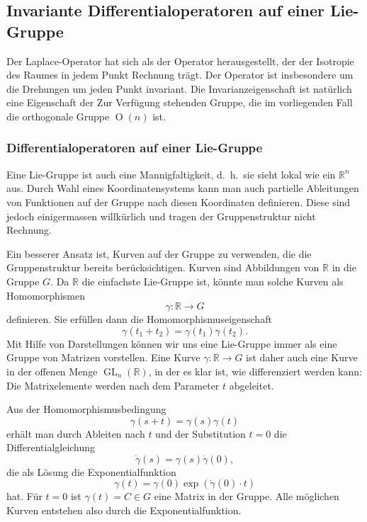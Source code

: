 %
%
\subsection{Invariante Differentialoperatoren auf einer Lie-Gruppe}
Der Laplace-Operator hat sich als der Operator herausgestellt, der
der Isotropie des Raumes in jedem Punkt Rechnung trägt.
Der Operator ist insbesondere um die Drehungen um jeden Punkt
invariant.
Die Invarianzeigenschaft ist natürlich eine Eigenschaft der 
Zur Verfügung stehenden Gruppe, die im vorliegenden Fall die
orthogonale Gruppe $\operatorname{O}(n)$ ist.

%
%
\subsubsection{Differentialoperatoren auf einer Lie-Gruppe}
Eine Lie-Gruppe ist auch eine Mannigfaltigkeit, d.~h.~sie sieht lokal
wie ein $\mathbb{R}^n$ aus.
Durch Wahl eines Koordinatensystems kann man auch partielle
Ableitungen von Funktionen auf der Gruppe nach diesen Koordinaten
definieren.
Diese sind jedoch einigermassen willkürlich und tragen der
Gruppenstruktur nicht Rechnung.

Ein besserer Ansatz ist, Kurven auf der Gruppe zu verwenden, die
die Gruppenstruktur bereits berücksichtigen.
Kurven sind Abbildungen von $\mathbb{R}$ in die Gruppe $G$.
Da $\mathbb{R}$ die einfachste Lie-Gruppe ist, könnte man solche
Kurven als Homomorphismen
\[
\gamma
\colon
\mathbb{R} \to  G
\]
definieren.
Sie erfüllen dann die Homomorphismuseigenschaft
\[
\gamma(t_1+t_2) = \gamma(t_1)\gamma(t_2).
\]
Mit Hilfe von Darstellungen können wir uns eine Lie-Gruppe immer als
eine Gruppe von Matrizen vorstellen.
Eine Kurve $\gamma\colon \mathbb{R}\to G$ ist daher auch eine Kurve in
der offenen Menge $\operatorname{GL}_n(\mathbb{R})$, in der es klar ist,
wie differenziert werden kann:
Die Matrixelemente werden nach dem Parameter $t$ abgeleitet.

Aus der Homomorphismusbedingung
\begin{equation}
\gamma(s+t)=\gamma(s)\gamma(t)
\label{buch:operatoren:casimir:eqn:homomorph}
\end{equation}
erhält man durch Ableiten nach $t$ und der Substitution $t=0$ die 
Differentialgleichung
\[
\dot{\gamma}(s) = \gamma(s) \dot{\gamma}(0),
\]
die als Lösung die Exponentialfunktion
\[
\gamma(t) = \gamma(0) \exp(\dot{\gamma}(0)\cdot t)
\]
hat.
Für $t=0$ ist $\gamma(t)=C\in G$ eine Matrix in der Gruppe.
Alle möglichen Kurven entstehen also durch die Exponentialfunktion.

